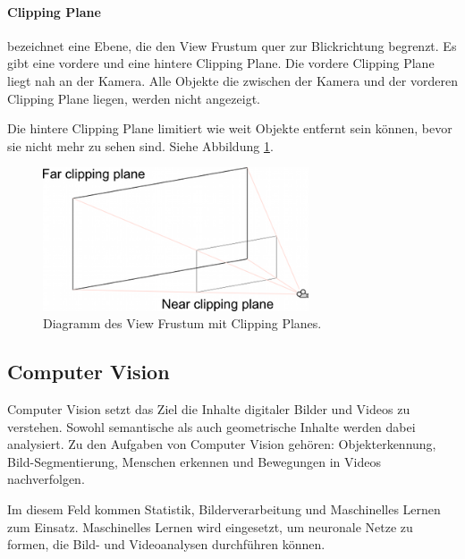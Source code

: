 \paragraph{Clipping Plane}
bezeichnet eine Ebene, die den View Frustum quer zur Blickrichtung begrenzt. 
Es gibt eine vordere und eine hintere Clipping Plane.
Die vordere Clipping Plane liegt nah an der Kamera. Alle Objekte die zwischen der Kamera und der vorderen Clipping Plane liegen, werden nicht angezeigt.

Die hintere Clipping Plane limitiert wie weit Objekte entfernt sein können, bevor sie nicht mehr zu sehen sind. Siehe Abbildung \ref{dia:clipping}.

\begin{figure}[H]
	\centering
	\includegraphics[width=0.7\textwidth]{images/dia_ViewFrustum.png}
	\caption[View Frustum.\citep{unityclipping}]{Diagramm des View Frustum mit Clipping Planes.\citep{unityclipping}}
	\label{dia:clipping}
\end{figure}


\subsection{Computer Vision}
Computer Vision setzt das Ziel die Inhalte digitaler Bilder und Videos zu verstehen. Sowohl semantische als auch geometrische Inhalte werden dabei analysiert. 
Zu den Aufgaben von Computer Vision gehören: Objekterkennung, Bild-Segmentierung, Menschen erkennen und Bewegungen in Videos nachverfolgen.



Im diesem Feld kommen Statistik, Bilderverarbeitung und Maschinelles Lernen zum Einsatz. Maschinelles Lernen wird eingesetzt, um neuronale Netze zu formen, die Bild- und Videoanalysen durchführen können.\citep{intortodeeplearingmedical}

